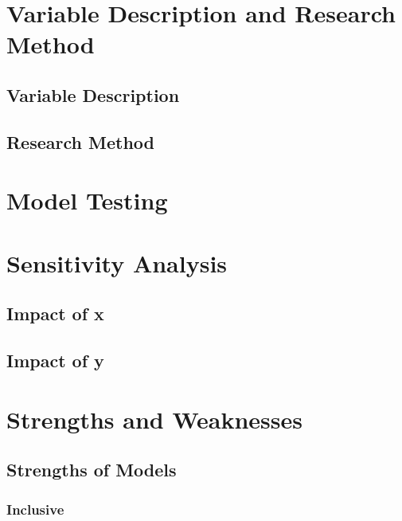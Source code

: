 \documentclass{mcmthesis}
\begin{document}
\section{Variable Description and Research Method}
\subsection{Variable Description}
\subsection{Research Method}








\section{Model Testing}

\section{Sensitivity Analysis}
\subsection{Impact of x}
\subsection{Impact of y}

\section{Strengths and Weaknesses}
\subsection{Strengths of Models}
\subsubsection{Inclusive}
\end{document}
